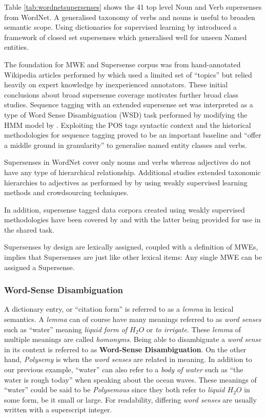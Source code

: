 Table \ref{tab:wordnetsupersenses} shows the 41 top level Noun and Verb supersenses from WordNet. A generalised taxonomy of verbs and nouns is useful to broaden semantic scope. Using dictionaries for supervised learning by \cite{ciaramita2003supersense} introduced a framework of closed set supersenses which generalised well for unseen Named entities. 

The foundation for MWE and Supersense corpus was from hand-annotated Wikipedia articles performed by \cite{Schneider2012} which used a limited set of ``topics'' but relied heavily on expert knowledge by inexperienced annotators. These initial conclusions about broad supersense coverage motivates further broad class studies. Sequence tagging with an extended supersense set was interpreted as a type of Word Sense Disambiguation (WSD) task performed by \cite{Ciaramita2006} modifying the HMM model by \cite{collins2002discriminative}. Exploiting the POS tags syntactic context and the historical methodologies for sequence tagging proved to be an important baseline and ``offer a middle ground in granularity'' to generalise named entity classes and verbs\cite{Schneider2016}.

Supersenses in WordNet cover only nouns and verbs whereas adjectives do not have any type of hierarchical relationship. Additional studies extended taxonomic hierarchies to adjectives as performed by \cite{Tsvetkov2014} by using weakly supervised learning methods and crowdsourcing techniques. 

In addition, supersense tagged data corpora created using weakly supervised methodologies have been covered by \cite{Johannsen2014} and \cite{Owoputi2012} with the latter being provided \cite{dimsum16webdata} for use in the \dimsum shared task\cite{dimsum16web}. 

Supersenses by design are lexically assigned, coupled with a definition of MWEs, implies that Supersenses are just like other lexical items: Any single MWE can be assigned a Supersense.

\subsubsection{Word-Sense Disambiguation}

A dictionary entry, or ``citation form'' is referred to as a {\it lemma} in lexical semantics. A {\it lemma} can of course have many meanings referred to as {\it word senses} such as ``water'' meaning {\it liquid form of ${H_2}O$} or {\it to irrigate}. These {\it lemma} of multiple meanings are called {\it homonyms}. Being able to disambiguate a {\it word sense} in its context is referred to as {\bf Word-Sense Disambiguation}.
On the other hand, {\it Polysemy} is when the {\it word senses} are related in meaning. In addition to our previous example, ``water'' can also refer to a {\it body of water} such as ``the water is rough today'' when speaking about the ocean waves. These meanings of ``water'' could be said to be {\it Polysemous} since they both refer to {\it liquid ${H_2}O$} in some form, be it small or large. For readability, differing {\it word senses} are usually written with a superscript integer.

